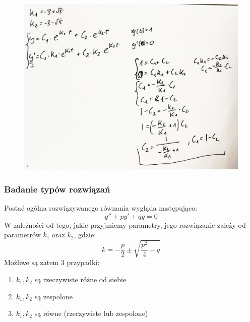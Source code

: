 \documentclass[12pt]{article}
\begin{document}
\begin{figure}[H]
\centering
    \includegraphics[scale=0.28]{./img/rozw-2.jpg}
\end{figure}

\subsubsection{Badanie typów rozwiązań}
Postać ogólna rozwiązywanego równania wygląda następująco:
$$ y'' + py' + qy = 0 $$
W zależności od tego, jakie przyjmiemy parametry, jego rozwiązanie zależy
od parametrów $k_1$ oraz $k_2$, gdzie:
$$k = -\frac{p}{2} \pm \sqrt{\frac{p^2}{4}-q}$$
Możliwe są zatem 3 przypadki:
\begin{enumerate}
    \item $k_1, k_2$ są rzeczywiste różne od siebie
    \item $k_1, k_2$ są zespolone
    \item $k_1, k_2$ są równe (rzeczywiste lub zespolone)
\end{enumerate}
\end{document}
